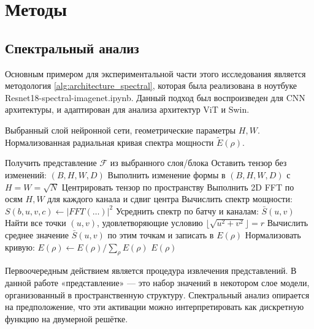 \chapter{Методы}

\section{Спектральный анализ}

Основным примером для экспериментальной части этого исследования является методология \ref{alg:architecture_spectral}, которая была реализована в ноутбуке Resnet18-spectral-imagenet.ipynb. Данный подход был воспроизведен для CNN архитектуры, и адаптирован для анализа архитектур ViT и Swin.

\begin{algorithm}[h]
\caption{Обобщенная процедура вычисления спектральной характеристики архитектуры}
\label{alg:architecture_spectral}
\vspace{1em}
\begin{algorithmic}[1]
\Require Выбранный слой нейронной сети, геометрические параметры $H, W$.
\Ensure Нормализованная радиальная кривая спектра мощности $\tilde E(\rho)$.
\vspace{1em}

\State Получить представление $\mathcal{F}$ из выбранного слоя/блока
    \State Оставить тензор без изменений: $(B, H, W, D)$
    \State Выполнить изменение формы в $(B, H, W, D)$ с $H=W=\sqrt{N}$
\EndIf
\State Центрировать тензор по пространству
\State Выполнить 2D FFT по осям $H,W$ для каждого канала и сдвиг центра 
\State Вычислить спектр мощности: $S(b, u, v, c) \gets |FFT(\dots)|^2$
\State Усреднить спектр по батчу и каналам: $\bar{S}(u, v)$
    \State Найти все точки $(u, v)$, удовлетворяющие условию $\lfloor \sqrt{u^2 + v^2} \rfloor = r$
    \State Вычислить среднее значение $\bar{S}(u, v)$ по этим точкам и записать в $E(\rho)$
\EndFor
\State Нормализовать кривую: $E(\rho) \gets E(\rho) / \sum_{\rho} E(\rho)$
\State \Return $E(\rho)$
\end{algorithmic}
\end{algorithm}

Первоочередным действием является процедура извлечения представлений. В данной работе «представление» — это набор значений в некотором слое модели, организованный в пространственную структуру. Спектральный анализ опирается на предположение, что эти активации можно интерпретировать как дискретную функцию на двумерной решётке.

